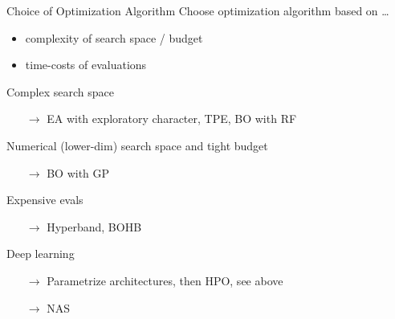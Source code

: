 \begin{frame}{Choice of Optimization Algorithm}
  Choose optimization algorithm based on \ldots
  \begin{itemize}
    \item complexity of search space / budget
    \item time-costs of evaluations
  \end{itemize}

  \vspace{0.5em}

  Complex search space
  \begin{itemize}
    \item[$\rightarrow$] EA with exploratory character, TPE, BO with RF 
  \end{itemize}
  Numerical (lower-dim) search space and tight budget
  \begin{itemize}
    \item[$\rightarrow$] BO with GP
  \end{itemize}
  Expensive evals
  \begin{itemize}
    \item[$\rightarrow$] Hyperband, BOHB
  \end{itemize}
  Deep learning 
  \begin{itemize}
    \item[$\rightarrow$]Parametrize architectures, then HPO, see above
    \item[$\rightarrow$]NAS 
  \end{itemize}

\end{frame}



